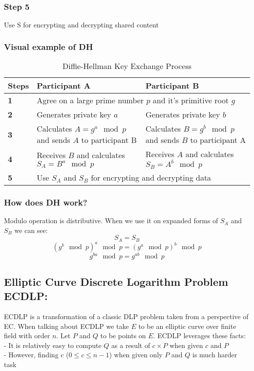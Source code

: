 \documentclass[bp,en]{FEIstyle}
\begin{document}
\subsubsection*{Step 5}
Use S for encrypting and decrypting shared content 

\subsubsection*{Visual example of DH}
\begin{table}[h!]
\centering
\small %
\begin{tabular}{|p{1cm}|p{5cm}|p{5cm}|} %
\hline
\textbf{Steps} & \textbf{Participant A} & \textbf{Participant B} \\ \hline
\textbf{1} & \multicolumn{2}{p{10cm}|}{Agree on a large prime number \( p \) and it's primitive root \( g \) } \\ \hline
\textbf{2} & Generates private key \( a \) & Generates private key \( b \)  \\ \hline
\textbf{3} & Calculates \( A = g^a \mod p \) and sends \( A \) to participant B & Calculates \( B = g^b \mod p \) and sends \( B \) to participant A \\ \hline
\textbf{4} & Receives \( B \)  and calculates \( S_A = B^a \mod p \) & Receives \( A \)  and calculates \( S_B = A^b \mod p \) \\ \hline
\textbf{5} & \multicolumn{2}{p{10cm}|}{Use \(S_A\) and \(S_B\) for encrypting and decrypting data } \\ \hline
\end{tabular}
\caption{Diffie-Hellman Key Exchange Process}
\label{tab:diffie_hellman}
\end{table}


\subsubsection*{How does DH work?}
Modulo operation is distributive. When we use it on expanded forms of $S_A$ and $S_B$ we can see:
\[S_A=S_B
\]
\[
(g^b \mod p)^a \mod p = (g^a \mod p)^b \mod p
\]
\[
g^{ba} \mod p = g^{ab} \mod p
\]

\subsection*{Elliptic Curve Discrete Logarithm Problem ECDLP:}
ECDLP is a transformation of a classic DLP problem taken from a perspective of EC. When talking about ECDLP we take $E$ to be an elliptic curve over finite field with order $n$. Let $P$ and $Q$ to be points on $E$. ECDLP leverages these facts:\\
- It is relatively easy to compute $Q$ as a result of $c\times P$ when given $c$ and $P$ \\
- However, finding $c$ ($0\leq c \leq n-1$) when given only $P$ and $Q$ is much harder task
\end{document}
